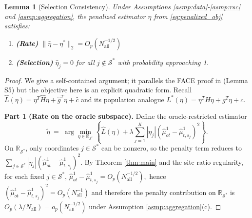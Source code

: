 \documentclass{article}
\newtheorem{lemma}[theorem]{Lemma}
\begin{document}
\begin{lemma}[Selection Consistency]\label{lem:selection}
Under Assumptions \ref{asmp:data}-\ref{asmp:rsc} and \ref{asmp:aggregation}, the penalized estimator $\widehat{\eta}$ from \eqref{eq:penalized_obj} satisfies:
\begin{enumerate}
    \item \textbf{(Rate)} $\|\widehat{\eta} - \eta^*\|_2 = O_p(N_{\mathrm{all}}^{-1/2})$
    \item \textbf{(Selection)} $\widehat{\eta}_j = 0$ for all $j \notin \mathcal{S}^*$ with probability approaching 1.
\end{enumerate}
\end{lemma}

\begin{proof}
We give a self-contained argument; it parallels the FACE proof in \citet{han2025federated} (Lemma S5) but the objective here is an explicit quadratic form.
Recall $\widehat{L}(\eta)=\eta^T\widehat{H}\eta+\widehat{g}^T\eta+\widehat{c}$ and its population analogue $L^*(\eta)=\eta^TH\eta+g^T\eta+c$.

\textbf{Part 1 (Rate on the oracle subspace).}
Define the oracle-restricted estimator
\[
\widetilde{\eta} \;=\; \arg\min_{\eta\in\mathbb{R}_{\mathcal{S}^*}}
\left\{ \widehat{L}(\eta) + \lambda \sum_{j=1}^K |\eta_j| (\widehat{\mu}^1_{ot} - \widehat{\mu}^1_{t,s_j})^2 \right\}.
\]
On $\mathbb{R}_{\mathcal{S}^*}$, only coordinates $j\in\mathcal{S}^*$ can be nonzero, so the penalty term reduces to $\sum_{j\in\mathcal{S}^*}|\eta_j|(\widehat{\mu}^1_{ot}-\widehat{\mu}^1_{t,s_j})^2$.
By Theorem \ref{thm:main} and the site-ratio regularity, for each fixed $j\in\mathcal{S}^*$,
$
\widehat{\mu}^1_{ot}-\widehat{\mu}^1_{t,s_j}=O_p(N_{\mathrm{all}}^{-1/2}),
$
hence $(\widehat{\mu}^1_{ot}-\widehat{\mu}^1_{t,s_j})^2=O_p(N_{\mathrm{all}}^{-1})$ and therefore the penalty contribution on $\mathbb{R}_{\mathcal{S}^*}$ is
$O_p(\lambda/N_{\mathrm{all}})=o_p(N_{\mathrm{all}}^{-1/2})$ under Assumption \ref{asmp:aggregation}(c).


\end{proof}
\end{document}
